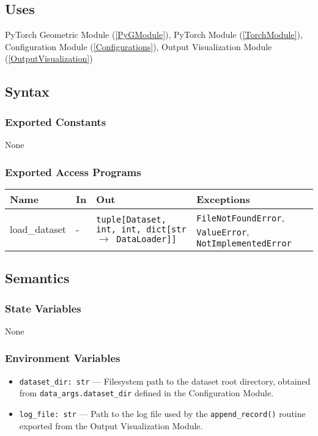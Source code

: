 \documentclass[12pt, titlepage]{article}
\begin{document}
\subsection{Uses}
PyTorch Geometric Module (\ref{PyGModule}), PyTorch Module (\ref{TorchModule}), Configuration Module (\ref{Configurations}), Output Visualization Module (\ref{OutputVisualization})

\subsection{Syntax}

\subsubsection{Exported Constants}
None

\subsubsection{Exported Access Programs}
\begin{center}
\begin{tabular}{p{3cm} >{\raggedright\arraybackslash}p{3cm} p{4.3cm} p{4cm}}
\hline
\textbf{Name} & \textbf{In} & \textbf{Out} & \textbf{Exceptions} \\
\hline
load\_dataset & - & \texttt{tuple[Dataset, int, int, dict[str $\rightarrow$ DataLoader]]} & \texttt{FileNotFoundError}, \texttt{ValueError}, \texttt{NotImplementedError} \\
\hline
\end{tabular}
\end{center}

\subsection{Semantics}

\subsubsection{State Variables}
None

\subsubsection{Environment Variables}
\begin{itemize}
  \item \texttt{dataset\_dir: str} — Filesystem path to the dataset root directory, obtained from \texttt{data\_args.dataset\_dir} defined in the Configuration Module.
  \item \texttt{log\_file: str} — Path to the log file used by the \texttt{append\_record()} routine exported from the Output Visualization Module.
\end{itemize}
\end{document}
